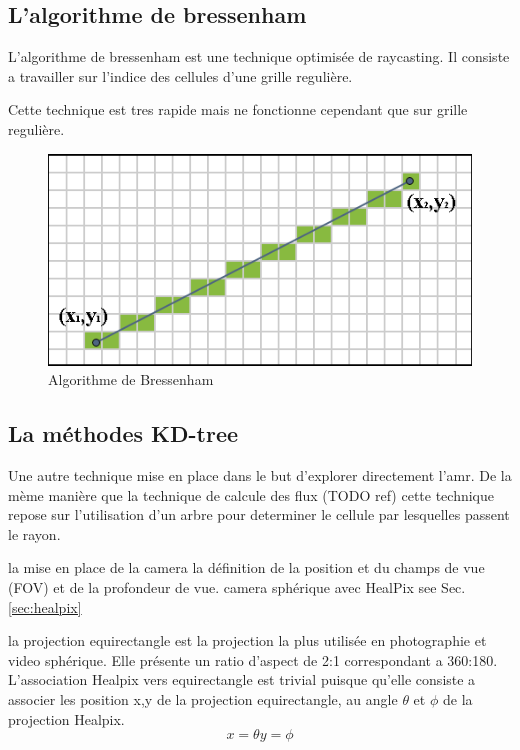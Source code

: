 \subsection{L'algorithme de bressenham}
L'algorithme de bressenham est une technique optimisée de raycasting.
Il consiste a travailler sur l'indice des cellules d'une grille regulière.

Cette technique est tres rapide mais ne fonctionne cependant que sur grille regulière.

\begin{figure}[bth]
        \includegraphics[width=.95\linewidth]{img/04/Bresenham_line.png} 
        \caption{Algorithme de Bressenham }
 		\label{fig:bressenham}
\end{figure}




\subsection{La méthodes KD-tree}

Une autre technique mise en place dans le but d'explorer directement l'amr.
De la mème manière que la technique de calcule des flux (TODO ref) cette technique repose sur l'utilisation d'un arbre pour determiner le cellule par lesquelles passent le rayon.





la mise en place de la camera
la définition de la position et du champs de vue (FOV) et de la profondeur de vue.
camera sphérique avec HealPix see Sec. \ref{sec:healpix}

la projection equirectangle est la projection la plus utilisée en photographie et video sphérique.
Elle présente un ratio d'aspect de 2:1 correspondant a 360:180.
L'association Healpix vers equirectangle est trivial puisque qu'elle consiste a associer les position x,y de la projection equirectangle, au angle $\theta$ et $\phi$ de la projection Healpix.
\begin{equation}
x=\theta
y=\phi
\end{equation}

